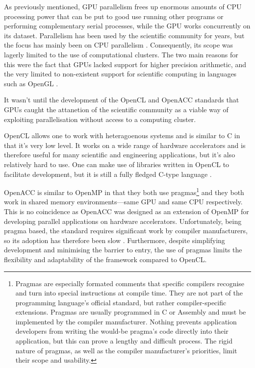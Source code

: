 As previously mentioned, GPU parallelism frees up enormous amounts of CPU processing power that can be put to good use running other programs or performing complementary serial processes, while the GPU works concurrently on its dataset. Parallelism has been used by the scientific community for years, but the focus has mainly been on CPU parallelism \cite{cpu_par}. Consequently, its scope was lagerly limited to the use of computational clusters. The two main reasons for this were the fact that GPUs lacked support for higher precision arithmetic, and the very limited to non-existent support for scientific computing in languages such as OpenGL \cite{gpu_comp}.

It wasn't until the development of the OpenCL and OpenACC standards that GPUs caught the attanetion of the scientific community as a viable way of exploiting parallelisation without access to a computing cluster.

OpenCL allows one to work with heteragoenous systems and is similar to C in that it's very low level. It works on a wide range of hardware accelerators and is therefore useful for many scientific and engineering applications, but it's also relatively hard to use. One can make use of libraries written in OpenCL to facilitate development, but it is still a fully fledged C-type language \cite{opencl}.

OpenACC is similar to OpenMP in that they both use pragmas\footnote{Pragmas are especially formated comments that specific compilers recognise and turn into special instructions at compile time. They are not part of the programming language's official standard, but rather compiler-specific extensions. Pragmas are usually programmed in C or Assembly and must be implemented by the compiler manufacturer. Nothing prevents application developers from writing the would-be pragma's code directly into their application, but this can prove a lengthy and difficult process. The rigid nature of pragmas, as well as the compiler manufacturer's priorities, limit their scope and usability.} and they both work in shared memory environments---same GPU and same CPU respectively. This is no coincidence as OpenACC was designed as an extension of OpenMP for developing parallel applications on hardware accelerators. Unfortunately, being pragma based, the standard requires significant work by compiler manufacturers, so its adoption has therefore been slow \cite{openacc}. Furthermore, despite simplifying development and minimising the barrier to entry, the use of pragmas limits the flexibility and adaptability of the framework compared to OpenCL.


